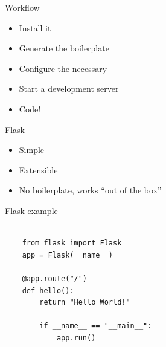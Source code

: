 \documentclass[ignorenonframetext,]{beamer}
\begin{document}
\begin{frame}[fragile]{Workflow}

\begin{itemize}[<+->]
\itemsep1pt\parskip0pt
\item
  Install it
\item
  Generate the boilerplate
\item
  Configure the necessary
\item
  Start a development server
\item
  Code!
\end{itemize}

\end{frame}

\begin{frame}[fragile]{Flask}

\begin{itemize}[<+->]
\itemsep1pt\parskip0pt
\item
  Simple
\item
  Extensible
\item
  No boilerplate, works ``out of the box''
\end{itemize}

\end{frame}

\begin{frame}[fragile]{Flask example}

\begin{verbatim}

    from flask import Flask
    app = Flask(__name__)

    @app.route("/")
    def hello():
        return "Hello World!"

        if __name__ == "__main__":
            app.run()

\end{verbatim}

\end{frame}
\end{document}
